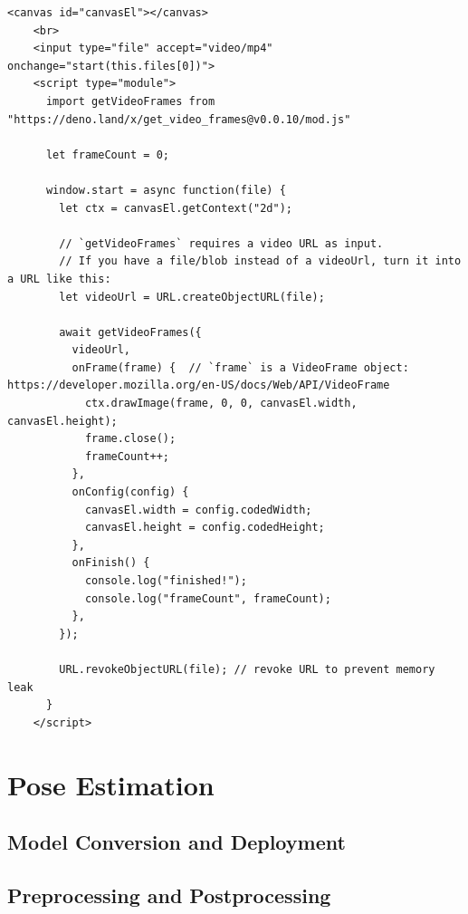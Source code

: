 \begin{lstlisting}[style=htmlcssjs, caption={Example usage of the getVideoFrames.js library. Taken from \url{https://github.com/josephrocca/getVideoFrames.js/}.}, label={getVideoFrames}]
    <canvas id="canvasEl"></canvas>
    <br>
    <input type="file" accept="video/mp4" onchange="start(this.files[0])">
    <script type="module">
      import getVideoFrames from "https://deno.land/x/get_video_frames@v0.0.10/mod.js"
      
      let frameCount = 0;
    
      window.start = async function(file) {
        let ctx = canvasEl.getContext("2d"); 
    
        // `getVideoFrames` requires a video URL as input.
        // If you have a file/blob instead of a videoUrl, turn it into a URL like this:
        let videoUrl = URL.createObjectURL(file);
    
        await getVideoFrames({
          videoUrl,
          onFrame(frame) {  // `frame` is a VideoFrame object: https://developer.mozilla.org/en-US/docs/Web/API/VideoFrame
            ctx.drawImage(frame, 0, 0, canvasEl.width, canvasEl.height);
            frame.close();
            frameCount++;
          },
          onConfig(config) {
            canvasEl.width = config.codedWidth;
            canvasEl.height = config.codedHeight;
          },
          onFinish() {
            console.log("finished!");
            console.log("frameCount", frameCount);
          },
        });
    
        URL.revokeObjectURL(file); // revoke URL to prevent memory leak
      }
    </script> 
\end{lstlisting}



\section{Pose Estimation}
\label{pose_estimation}

\subsection{Model Conversion and Deployment}

\subsection{Preprocessing and Postprocessing}



